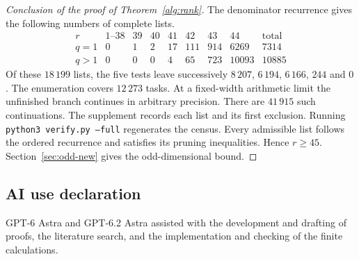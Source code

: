 \documentclass[11pt]{amsart}
\numberwithin{equation}{section}
\theoremstyle{definition}
\theoremstyle{plain}
\begin{document}
\begin{proof}[Conclusion of the proof of Theorem~\ref{alg:rank}]
The denominator recurrence gives the following numbers of complete lists.
\[
\begin{array}{c|rrrrrrr|r}
 r&1\text{--}38&39&40&41&42&43&44&\text{total}\\ \hline
 q=1&0&1&2&17&111&914&6269&7314\\
 q>1&0&0&0&4&65&723&10093&10885
\end{array}
\]
Of these $18\,199$ lists, the five tests leave successively
$8\,207$, $6\,194$, $6\,166$, $244$ and $0$. The enumeration covers
$12\,273$ tasks. At a fixed-width arithmetic limit the unfinished branch
continues in arbitrary precision. There are $41\,915$ such continuations.
The supplement records each list and its first exclusion. Running
\texttt{python3 verify.py --full} regenerates the census. Every admissible
list follows the ordered recurrence and satisfies its pruning inequalities.
Hence $r\ge45$. Section~\ref{sec:odd-new} gives the odd-dimensional bound.
\end{proof}

\subsection*{AI use declaration}
GPT-6 Astra and GPT-6.2 Astra assisted with the development and drafting of proofs, the literature search, and the implementation and checking of the finite calculations.
\end{document}

